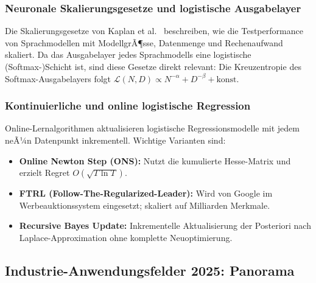 ﻿\documentclass[12pt, a4paper]{article}
\theoremstyle{definition}
\theoremstyle{remark}
\begin{document}
\subsubsection{Neuronale Skalierungsgesetze und logistische Ausgabelayer}

Die Skalierungsgesetze von Kaplan et al.~\citep{kaplan2020scaling} beschreiben, wie die
Testperformance von Sprachmodellen mit ModellgrÃ¶sse, Datenmenge und Rechenaufwand skaliert.
Da das Ausgabelayer jedes Sprachmodells eine logistische (Softmax-)Schicht ist, sind diese
Gesetze direkt relevant: Die Kreuzentropie des Softmax-Ausgabelayers folgt
$\mathcal{L}(N, D) \propto N^{-\alpha} + D^{-\beta} + \text{konst.}$

\subsubsection{Kontinuierliche und online logistische Regression}

Online-Lernalgorithmen aktualisieren logistische Regressionsmodelle mit jedem neÃ¼n
Datenpunkt inkrementell. Wichtige Varianten sind:

\begin{itemize}
  \item \textbf{Online Newton Step (ONS):} Nutzt die kumulierte Hesse-Matrix und erzielt
    Regret $O(\sqrt{T\ln T})$.
  \item \textbf{FTRL (Follow-The-Regularized-Leader):} Wird von Google im Werbeauktionssystem
    eingesetzt; skaliert auf Milliarden Merkmale.
  \item \textbf{Recursive Bayes Update:} Inkrementelle Aktualisierung der Posteriori nach
    Laplace-Approximation ohne komplette Neuoptimierung.
\end{itemize}

\subsection{Industrie-Anwendungsfelder 2025: Panorama}
\end{document}
